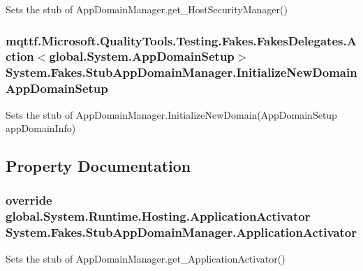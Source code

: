 Sets the stub of App\-Domain\-Manager.\-get\-\_\-\-Host\-Security\-Manager()

\hypertarget{class_system_1_1_fakes_1_1_stub_app_domain_manager_a4f61f37bd2ee9ad0a086dc74d8fb813e}{
\subsubsection[{Initialize\-New\-Domain\-App\-Domain\-Setup}]{\setlength{\rightskip}{0pt plus 5cm}mqttf.\-Microsoft.\-Quality\-Tools.\-Testing.\-Fakes.\-Fakes\-Delegates.\-Action$<$global.\-System.\-App\-Domain\-Setup$>$ System.\-Fakes.\-Stub\-App\-Domain\-Manager.\-Initialize\-New\-Domain\-App\-Domain\-Setup}}\label{class_system_1_1_fakes_1_1_stub_app_domain_manager_a4f61f37bd2ee9ad0a086dc74d8fb813e}


Sets the stub of App\-Domain\-Manager.\-Initialize\-New\-Domain(\-App\-Domain\-Setup app\-Domain\-Info)



\subsection{Property Documentation}
\hypertarget{class_system_1_1_fakes_1_1_stub_app_domain_manager_ac129372fa6597ea6e659b735ad230615}{
\subsubsection[{Application\-Activator}]{\setlength{\rightskip}{0pt plus 5cm}override global.\-System.\-Runtime.\-Hosting.\-Application\-Activator System.\-Fakes.\-Stub\-App\-Domain\-Manager.\-Application\-Activator\hspace{0.3cm}{\ttfamily [get]}}}\label{class_system_1_1_fakes_1_1_stub_app_domain_manager_ac129372fa6597ea6e659b735ad230615}


Sets the stub of App\-Domain\-Manager.\-get\-\_\-\-Application\-Activator()

